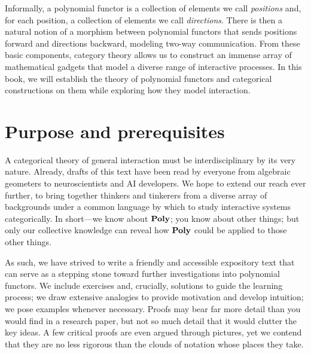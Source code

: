 \documentclass[Book-Poly]{subfiles}
\begin{document}

Informally, a polynomial functor is a collection of elements we call \emph{positions} and, for each position, a collection of elements we call \emph{directions}.
There is then a natural notion of a morphism between polynomial functors that sends positions forward and directions backward, modeling two-way communication.
From these basic components, category theory allows us to construct an immense array of mathematical gadgets that model a diverse range of interactive processes.
In this book, we will establish the theory of polynomial functors and categorical constructions on them while exploring how they model interaction.

\section{Purpose and prerequisites}

A categorical theory of general interaction must be interdisciplinary by its very nature.
Already, drafts of this text have been read by everyone from algebraic geometers to neuroscientists and AI developers.
We hope to extend our reach ever further, to bring together thinkers and tinkerers from a diverse array of backgrounds under a common language by which to study interactive systems categorically.
In short---we know about $\mathbf{Poly}$; you know about other things; but only our collective knowledge can reveal how $\mathbf{Poly}$ could be applied to those other things.


As such, we have strived to write a friendly and accessible expository text that can serve as a stepping stone toward further investigations into polynomial functors.
We include exercises and, crucially, solutions to guide the learning process; we draw extensive analogies to provide motivation and develop intuition; we pose examples whenever necessary.
Proofs may bear far more detail than you would find in a research paper, but not so much detail that it would clutter the key ideas.
A few critical proofs are even argued through pictures, yet we contend that they are no less rigorous than the clouds of notation whose places they take.
\end{document}
